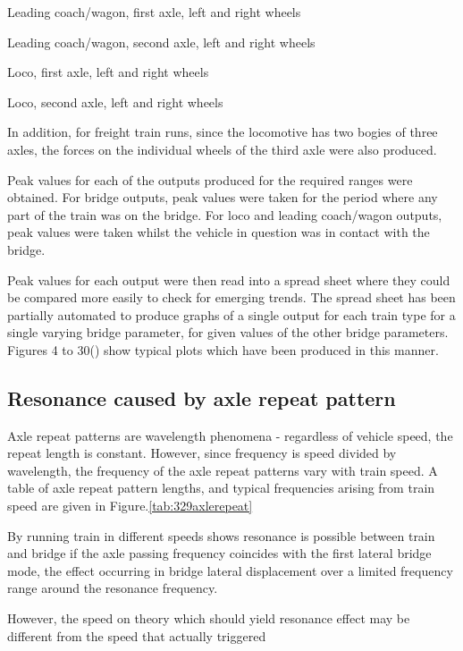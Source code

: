 \begin{appendices}
Leading coach/wagon, first axle, left and right wheels 

Leading coach/wagon, second axle, left and right wheels 

Loco, first axle, left and right wheels

Loco, second axle, left and right wheels

\vspace*{\baselineskip}

In addition, for freight train runs, since the locomotive has two bogies of three axles, the forces on the individual wheels of the third axle were also produced.

Peak values for each of the outputs produced for the required ranges were obtained. For bridge outputs, peak values were taken for the period where any part of the train was on the bridge. For loco and leading coach/wagon outputs, peak values were taken whilst the vehicle in question was in contact with the bridge.

Peak values for each output were then read into a spread sheet where they could be compared more easily to check for emerging trends. The spread sheet has been partially automated to produce graphs of a single output for each train type for a single varying bridge parameter, for given values of the other bridge parameters. Figures 4 to 30(\cite{d181dt329}) show typical plots which have been produced in this manner.

\subsection{Resonance caused by axle repeat pattern}

Axle repeat patterns are wavelength phenomena - regardless of vehicle speed, the repeat length is constant. However, since frequency is speed divided by wavelength, the frequency of the axle repeat patterns vary with train speed. A table of axle repeat pattern lengths, and typical frequencies arising from train speed are given in Figure.\ref{tab:329axlerepeat}

By running train in different speeds shows resonance is possible between train and bridge if the axle passing frequency coincides with the first lateral bridge mode, the effect occurring in bridge lateral displacement over a limited frequency range around the resonance frequency.

However, the speed on theory which should yield resonance effect may be different from the speed that actually triggered 


\end{appendices}
